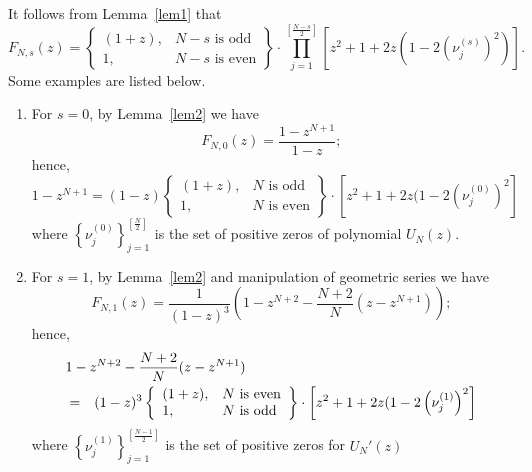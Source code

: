 \documentclass[12pt]{article}
\newcommand{\pa}[1]{\left(#1\right)}
\newcommand{\br}[1]{\left[#1\right]}
\newcommand{\cb}[1]{\left\{#1\right\}}
\begin{document}
It follows from Lemma~\ref{lem1} that
\begin{displaymath}
F_{N,s}(z) = \left\{\begin{array}{ll}
(1 + z), & N - s \mbox{ is odd} \\
1, & N - s \mbox{ is even}
\end{array}\right\} \cdot
\prod_{j = 1}^{\br{\frac{N - s}{2}}}\br{z^2 + 1 + 2z\pa{1 - 2\pa{\nu_j^{(s)}}^2}}.
\end{displaymath}
Some examples are listed below.
\begin{enumerate}
\item For $s = 0$, by Lemma~\ref{lem2} we have
\begin{displaymath}
F_{N,0}(z) = \frac{1 - z^{N + 1}}{1 - z};
\end{displaymath}
hence,
\begin{displaymath}
1 - z^{N + 1} = (1 - z)\left\{\begin{array}{ll}
(1 + z), & N \mbox{ is odd} \\
1, & N \mbox{ is even}
\end{array}\right\} \cdot \br{z^2 + 1 + 2z(1 - 2\pa{\nu_j^{(0)}}^2}
\end{displaymath}
where $\cb{\nu_j^{(0)}}_{j = 1}^{\br{\frac{N}{2}}}$ is the set of positive zeros of polynomial $U_N(z)$.

\item For $s = 1$, by Lemma~\ref{lem2} and manipulation of geometric series we have
\begin{displaymath}
F_{N,1}(z) = \frac{1}{(1 - z)^3}\pa{1 - z^{N + 2} - \frac{N + 2}{N} (z - z^{N + 1})};
\end{displaymath}
hence,
\begin{eqnarray*}
\lefteqn{1 - z^{N + 2} - \frac{N + 2}{N}(z - z^{N + 1})}  \\
&=& (1 - z)^3\left\{\begin{array}{ll}
(1 + z), & N \mbox{ is even} \\
1, & N \mbox{ is odd}
\end{array}\right\} \cdot \br{z^2 + 1 + 2z(1 - 2\pa{\nu_j^{(1)}}^2}
\end{eqnarray*}
where $\cb{\nu_j^{(1)}}_{j = 1}^{\br{\frac{N - 1}{2}}}$ is the set of positive zeros for $U_N'(z)$


\end{enumerate}
\end{document}
